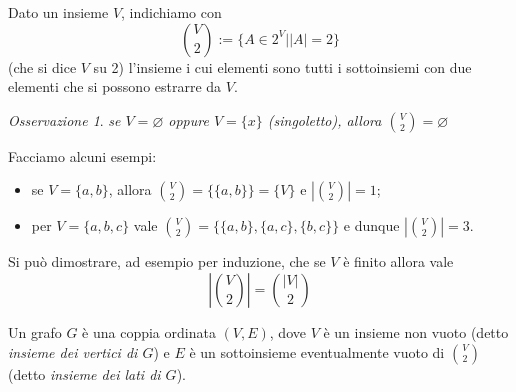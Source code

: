 \documentclass[oneside]{book}
\theoremstyle{remark}
\newtheorem*{osservaz}{Osservazione}
\begin{document}
\begin{tcolorbox}[colback=yellow!30, colframe=yellow!30!black, title=Insieme dei 2-sottoinsiemi]
Dato un insieme $V$, indichiamo con \[ \binom{V}{2}:=\{ A \in 2^V| \left|A\right|=2 \} \]
(che si dice $V$ su 2) l'insieme i cui elementi sono tutti i sottoinsiemi con
due elementi che si possono estrarre da $V$.
\end{tcolorbox}
\begin{osservaz}
\emph{se $V = \varnothing$ oppure $V = \{x\}$ (singoletto), allora $\binom{V}{2} = \varnothing$}
\end{osservaz}
\noindent Facciamo alcuni esempi:
\begin{itemize}
\item se $V=\{a,b\}$, allora $\binom{V}{2}=\{\{a,b\}\}=\{V\}$ e $|\binom{V}{2}|=1$;
\item per $V=\{a,b,c\}$ vale $\binom{V}{2} = \{\{a,b\},\{a,c\},\{b,c\}\}$ e dunque $|\binom{V}{2}|=3$.
\end{itemize}
Si può dimostrare, ad esempio per induzione,
che se $V$ è finito allora vale
\[ \left|\binom{V}{2}\right| = \binom{|V|}{2} \]

\begin{tcolorbox}[colback=yellow!30, colframe=yellow!30!black, title=Grafo]
Un grafo $G$ è una coppia ordinata $(V,E)$, dove $V$ è un insieme non vuoto
(detto \textit{insieme dei vertici di $G$}) e $E$ è un sottoinsieme eventualmente
vuoto di $\binom{V}{2}$ (detto \textit{insieme dei lati di $G$}).
\end{tcolorbox}
\end{document}
